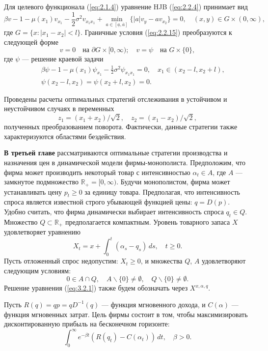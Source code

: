 Для целевого функционала (\ref{eq:2.1.4}) уравнение HJB (\ref{eq:2.2.4}) принимает вид
$$ \beta v-1-\mu(x_1)v_{x_1}-\frac{1}{2}\sigma^2 v_{x_1 x_1}+\min_{a\in [\underline a,\overline a]}\{|a| v_y-a v_{x_2}\}=0,\quad
(x,y)\in G\times (0,\infty), $$
где $G=\{x:|x_1-x_2|<l\}$. Граничные условия (\ref{eq:2.2.15}) преобразуются к следующей форме
$$ v=0\quad \textrm{на } \partial G\times [0,\infty);\quad v=\psi\quad \textrm{на } G\times\{0\},$$
где $\psi$ --- решение краевой задачи
\begin{eqnarray}
&&\beta \psi-1-\mu(x_1)\psi_{x_1}-\frac{1}{2}\sigma^2 \psi_{x_1 x_1}=0,\quad x_1\in (x_2-l,x_2+l),\label{eq:2.4.1}\\
&&\psi(x_2-l,x_2)=\psi(x_2+l,x_2)=0.\label{eq:2.4.2}
\end{eqnarray}

Проведены расчеты оптимальных стратегий отслеживания в устойчивом и неустойчивом случаях в переменных
$$z_1=(x_1+x_2)/\sqrt 2,\quad z_2=(x_1-x_2)/\sqrt 2,$$
полученных преобразованием поворота. Фактически, данные стратегии также характеризуются областями бездействия. 

\textbf{В третьей главе} рассматриваются оптимальные стратегии производства и назначения цен в динамической модели фирмы-монополиста.
Предположим, что фирма может производить некоторый товар с интенсивностью $\alpha_t\in A$, где $A$ --- замкнутое подмножество $\mathbb R_+=[0,\infty)$. Будучи монополистом, фирма может устанавливать цену $p_t\ge 0$ за единицу товара.
Предполагая, что интенсивность спроса является известной строго убывающей функцией цены: $q=D(p)$. Удобно считать, что фирма динамически выбирает интенсивность спроса $q_t\in Q$. Множество $Q\subset\mathbb R_+$ предполагается компактным. Уровень товарного запаса $X$ удовлетворяет уравнению
\begin{equation} \label{eq:3.2.1}
X_t=x+\int_0^t (\alpha_s-q_s)\,ds,\quad t\ge 0.
\end{equation}
Пусть отложенный спрос недопустим: $X_t\ge 0$, и множества $Q$, $A$ удовлетворяют следующим условиям:
\begin{equation} \label{eq:3.2.2}
0\in A\cap Q,\quad A\backslash\{0\}\neq\emptyset,\quad Q\backslash\{0\}\neq\emptyset.
\end{equation}
Решение уравнения (\ref{eq:3.2.1}) также будем обозначать через $X^{x,\alpha,q}$.

Пусть $R(q)=qp=qD^{-1}(q)$ --- функция мгновенного дохода, и $C(\alpha)$ --- функция мгновенных затрат. Цель фирмы состоит в том, чтобы максимизировать дисконтированную прибыль на бесконечном горизонте:
$$ \int_0^\infty e^{-\beta t} (R(q_t)-C(\alpha_t))\,dt,\quad \beta>0.$$

